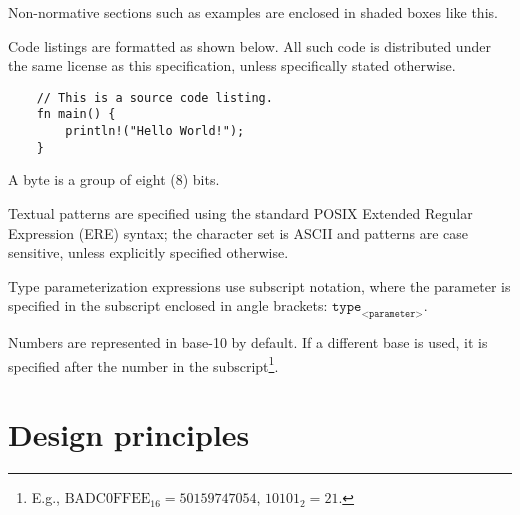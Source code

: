 \begin{remark}
    Non-normative sections such as examples are enclosed in shaded boxes like this.
\end{remark}

Code listings are formatted as shown below.
All such code is distributed under the same license as this specification, unless specifically stated otherwise.

\begin{verbatim}
    // This is a source code listing.
    fn main() {
        println!("Hello World!");
    }
\end{verbatim}

A byte is a group of eight (8) bits.

Textual patterns are specified using the standard
POSIX Extended Regular Expression (ERE) syntax;
the character set is ASCII and patterns are case sensitive, unless explicitly specified otherwise.

Type parameterization expressions use subscript notation,
where the parameter is specified in the subscript enclosed in angle brackets:
$\texttt{type}_\texttt{<parameter>}$.

Numbers are represented in base-10 by default.
If a different base is used, it is specified after the number in the subscript\footnote{%
    E.g., $\text{BADC0FFEE}_{16} = 50159747054$, $10101_2 = 21$.
}.

\section{Design principles}

